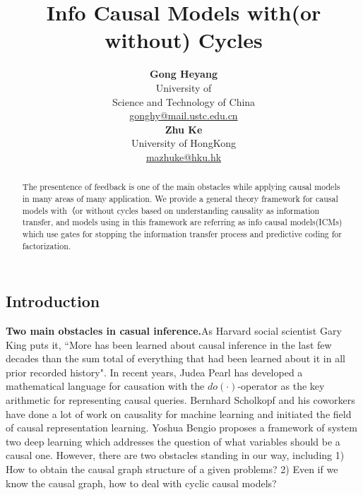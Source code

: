 \documentclass[letterpaper, onecolumn]{article}
\title{Info Causal Models with(or without) Cycles}
\author{ {\bf Gong Heyang}\\
	University of \\ Science and Technology of China\\
	\url{gonghy@mail.ustc.edu.cn}\\
	\And
	{\bf Zhu Ke}\\
	University of HongKong \\
	\url{mazhuke@hku.hk}\\
}
\begin{document}
\begin{CJK*}{UTF8}{gbsn}
\maketitle
    \begin{abstract}
        The presentence of feedback is one of the main obstacles while applying causal models in many areas of many application. We provide a general theory framework for causal models with（or without cycles based on understanding causality as information transfer, and models using in this framework are referring as info causal models(ICMs) which use gates for stopping the information transfer process and predictive coding for factorization.
    \end{abstract}
	
    \tableofcontents
    \newpage
    
    \section{Introduction}
    
    \textbf{Two main obstacles in casual inference.}As Harvard social scientist Gary King puts it, “More has been learned about causal inference in the last few decades than the sum total of everything that had been learned about it in all prior recorded history"\cite{brockman2020possible}. In recent years, Judea Pearl has developed a mathematical language for causation with the $do(\cdot)$-operator as the key arithmetic for representing causal queries. Bernhard Scholkopf and his coworkers have done a lot of work on causality for machine learning and initiated the field of causal representation learning. Yoshua Bengio proposes a framework of system two deep learning which addresses the question of what variables should be a causal one. However, there are two obstacles standing in our way, including 1) How to obtain the causal graph structure of a given problems? 2) Even if we know the causal graph, how to deal with cyclic causal models?
    
    

\end{CJK*}
\end{document}
